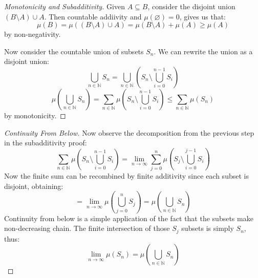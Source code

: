 \documentclass[10pt,letterpaper]{article} %
\begin{document}
\begin{proof}[Monotonicity and Subadditivity]
Given $A \subseteq B$, consider the disjoint union $(B \setminus A) \cup A$. Then countable addiivity and $\mu(\varnothing) = 0$, gives us that:
\begin{equation*}
\mu(B) = \mu((B\setminus A) \cup A) = \mu(B\setminus A) + \mu(A) \geqslant \mu(A)
\end{equation*}
by non-negativity.

Now consider the countable union of subsets $S_n$. We can rewrite the union as a disjoint union:
\begin{equation*}
\bigcup_{n \in \mathbb{N}}S_n = \bigcup_{n \in \mathbb{N}}\left(S_n \setminus \bigcup_{i=0}^{n-1} S_i\right)
\end{equation*}
\begin{equation*}
\mu\left(\bigcup_{n \in \mathbb{N}}S_n\right) = \sum_{n \in \mathbb{N}}\mu\left(S_n \setminus \bigcup_{i=0}^{n-1}S_i\right) \leqslant \sum_{n \in \mathbb{N}}\mu(S_n)
\end{equation*}
by monotonicity.
\end{proof}

\begin{proof}[Continuity From Below]
Now observe the decomposition from the previous step in the subadditivity proof:
\begin{equation*}
\sum_{n \in \mathbb{N}}\mu\left(S_n \setminus \bigcup_{i=0}^{n-1}S_i\right) = \lim_{n \xrightarrow{} \infty}\sum_{j=0}^{n}\mu\left(S_j \setminus \bigcup_{i=0}^{j-1}S_i\right)
\end{equation*}
Now the finite sum can be recombined by finite additivity since each subset is disjoint, obtaining:
\begin{equation*}
= \lim_{n \xrightarrow{} \infty}\mu\left(\bigcup_{j=0}^n S_j\right) = \mu\left(\bigcup_{n \in \mathbb{N}}S_n\right)
\end{equation*}
Continuity from below is a simple application of the fact that the subsets make non-decreasing chain. The finite intersection of those $S_j$ subsets is simply $S_n$, thus:
\begin{equation*}
\lim_{n \xrightarrow{} \infty}\mu(S_n) = \mu\left(\bigcup_{n \in \mathbb{N}}S_n\right)
\end{equation*}
\end{proof}
\end{document}

